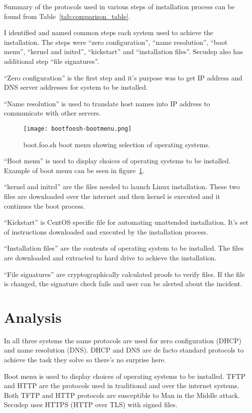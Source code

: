 Summary of the protocols used in various steps of installation process
can be found from Table~\ref{tab:comparison_table}.

I identified and named common steps each system used to achieve the
installation. The steps were ``zero configuration'', ``name
resolution'', ``boot menu'', ``kernel and initrd'', ``kickstart'' and
``installation files''. Secudep also has additional step ``file
signatures''.

``Zero configuration'' is the first step and it's purpose was to get
IP address and DNS server addresses for system to be installed.

``Name resolution'' is used to translate host names into IP address to
communicate with other servers.

\begin{figure}[h]
  \texttt{[image: bootfoosh-bootmenu.png]}
  \caption{boot.foo.sh boot menu showing selection of operating systems.}
  \label{fig:bootmenu}
\end{figure}

``Boot menu'' is used to display choices of operating systems to be
installed. Example of boot menu can be seen in figure~\ref{fig:bootmenu}.

``kernel and initrd'' are the files needed to launch Linux
installation. These two files are downloaded over the internet and
then kernel is executed and it continues the boot process.

``Kickstart'' is CentOS specific file for automating unattended
installation. It's set of instructions downloaded and executed by the
installation process.

``Installation files'' are the contents of operating system to be
installed. The files are downloaded and extracted to hard drive to
achieve the installation.

``File signatures'' are cryptographically calculated proofs to verify
files. If the file is changed, the signature check fails and user can
be alerted about the incident.

\section{Analysis}

In all three systems the same protocols are used for zero
configuration (DHCP) and name resolution (DNS). DHCP and DNS are de
facto standard protocols to achieve the task they solve so there's no
surprise here.

Boot menu is used to display choices of operating systems to be
installed. TFTP and HTTP are the protocols used in traditional and
over the internet systems. Both TFTP and HTTP protocols are
susceptible to Man in the Middle attack. Secudep uses HTTPS (HTTP over
TLS) with signed files.

